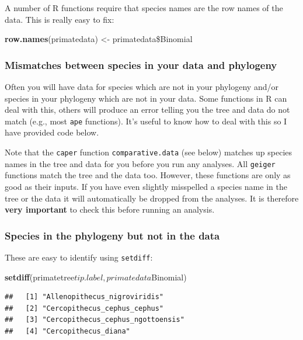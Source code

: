 \documentclass[12pt]{article}
\newcommand{\KeywordTok}[1]{\textcolor[rgb]{0.13,0.29,0.53}{\textbf{{#1}}}}
\newcommand{\StringTok}[1]{\textcolor[rgb]{0.31,0.60,0.02}{{#1}}}
\newcommand{\NormalTok}[1]{{#1}}
\begin{document}
A number of R functions require that species names are the row names of the data. This is really easy to fix:

\begin{snugshade}
\begin{Highlighting}[]
\KeywordTok{row.names}\NormalTok{(primatedata) <-}\StringTok{ }\NormalTok{primatedata\$Binomial}
\end{Highlighting}
\end{snugshade}

\subsubsection{Mismatches between species in your data and phylogeny}
Often you will have data for species which are not in your phylogeny and/or species in your phylogeny which are not in your data. Some functions in R can deal with this, others will produce an error telling you the tree and data do not match (e.g., most \texttt{ape} functions). It's useful to know how to deal with this so I have provided code below.

\begin{framed}
Note that the \texttt{caper} function \texttt{comparative.data} (see below) matches up species names in the tree and data for you before you run any analyses. All \texttt{geiger} functions match the tree and the data too. However, these functions are only as good as their inputs. If you have even slightly misspelled a species name in the tree or the data it will automatically be dropped from the analyses. It is therefore \textbf{very important} to check this before running an analysis.
\end{framed}

\subsubsection{Species in the phylogeny but not in the data}
These are easy to identify using \texttt{setdiff}:

\begin{snugshade}
\begin{Highlighting}[]
\KeywordTok{setdiff}\NormalTok{(primatetree$tip.label, primatedata$Binomial)}
\end{Highlighting}
\end{snugshade}

\begin{verbatim}
##   [1] "Allenopithecus_nigroviridis"                  
##   [2] "Cercopithecus_cephus_cephus"                  
##   [3] "Cercopithecus_cephus_ngottoensis"             
##   [4] "Cercopithecus_diana" 
\end{verbatim}
\end{document}
